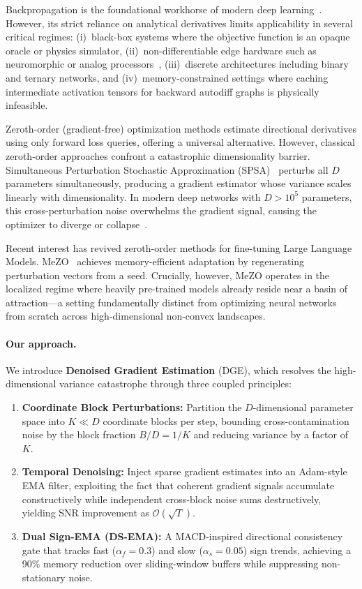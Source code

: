 \documentclass[11pt,a4paper]{article}
\begin{document}
Backpropagation is the foundational workhorse of modern deep learning~\citep{rumelhart1986learning,lecun2015deep}. However, its strict reliance on analytical derivatives limits applicability in several critical regimes: (i)~black-box systems where the objective function is an opaque oracle or physics simulator, (ii)~non-differentiable edge hardware such as neuromorphic or analog processors~\citep{schuman2022opportunities,davies2018loihi}, (iii)~discrete architectures including binary~\citep{yin2020binary} and ternary networks, and (iv)~memory-constrained settings where caching intermediate activation tensors for backward autodiff graphs is physically infeasible.

Zeroth-order (gradient-free) optimization methods estimate directional derivatives using only forward loss queries, offering a universal alternative. However, classical zeroth-order approaches confront a catastrophic dimensionality barrier. Simultaneous Perturbation Stochastic Approximation (SPSA)~\citep{spall1992multivariate} perturbs all $D$ parameters simultaneously, producing a gradient estimator whose variance scales linearly with dimensionality. In modern deep networks with $D > 10^5$ parameters, this cross-perturbation noise overwhelms the gradient signal, causing the optimizer to diverge or collapse~\citep{ghadimi2013optimal}.

Recent interest has revived zeroth-order methods for fine-tuning Large Language Models. MeZO~\citep{malladi2023mezo} achieves memory-efficient adaptation by regenerating perturbation vectors from a seed. Crucially, however, MeZO operates in the localized regime where heavily pre-trained models already reside near a basin of attraction---a setting fundamentally distinct from optimizing neural networks from scratch across high-dimensional non-convex landscapes.

\paragraph{Our approach.} We introduce \textbf{Denoised Gradient Estimation} (DGE), which resolves the high-dimensional variance catastrophe through three coupled principles:
\begin{enumerate}
    \item \textbf{Coordinate Block Perturbations:} Partition the $D$-dimensional parameter space into $K \ll D$ coordinate blocks per step, bounding cross-contamination noise by the block fraction $B/D = 1/K$ and reducing variance by a factor of $K$.
    \item \textbf{Temporal Denoising:} Inject sparse gradient estimates into an Adam-style EMA filter, exploiting the fact that coherent gradient signals accumulate constructively while independent cross-block noise sums destructively, yielding SNR improvement as $\mathcal{O}(\sqrt{T})$.
    \item \textbf{Dual Sign-EMA (DS-EMA):} A MACD-inspired directional consistency gate that tracks fast ($\alpha_f = 0.3$) and slow ($\alpha_s = 0.05$) sign trends, achieving a 90\% memory reduction over sliding-window buffers while suppressing non-stationary noise.
\end{enumerate}
\end{document}
